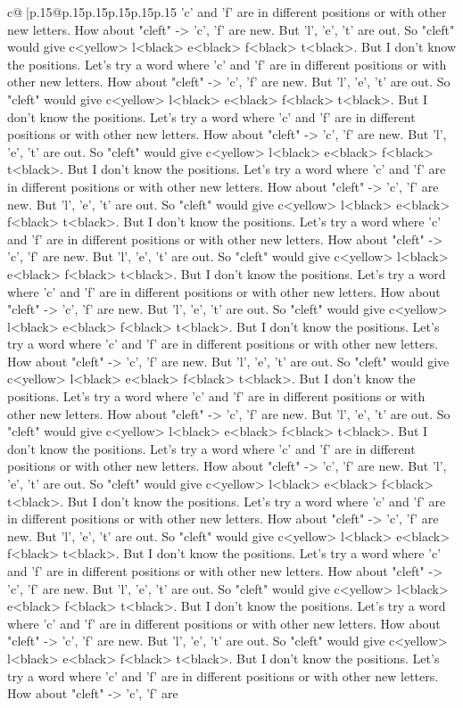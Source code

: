 \documentclass{article}
\begin{document}
{\begin{supertabular}{c@{$\;$}|p{.15\linewidth}@{}p{.15\linewidth}p{.15\linewidth}p{.15\linewidth}p{.15\linewidth}p{.15\linewidth}}
{{{'c' and 'f' are in different positions or with other new letters. How about "cleft" {-}> 'c', 'f' are new. But 'l', 'e', 't' are out. So "cleft" would give c<yellow> l<black> e<black> f<black> t<black>. But I don't know the positions. Let's try a word where 'c' and 'f' are in different positions or with other new letters. How about "cleft" {-}> 'c', 'f' are new. But 'l', 'e', 't' are out. So "cleft" would give c<yellow> l<black> e<black> f<black> t<black>. But I don't know the positions. Let's try a word where 'c' and 'f' are in different positions or with other new letters. How about "cleft" {-}> 'c', 'f' are new. But 'l', 'e', 't' are out. So "cleft" would give c<yellow> l<black> e<black> f<black> t<black>. But I don't know the positions. Let's try a word where 'c' and 'f' are in different positions or with other new letters. How about "cleft" {-}> 'c', 'f' are new. But 'l', 'e', 't' are out. So "cleft" would give c<yellow> l<black> e<black> f<black> t<black>. But I don't know the positions. Let's try a word where 'c' and 'f' are in different positions or with other new letters. How about "cleft" {-}> 'c', 'f' are new. But 'l', 'e', 't' are out. So "cleft" would give c<yellow> l<black> e<black> f<black> t<black>. But I don't know the positions. Let's try a word where 'c' and 'f' are in different positions or with other new letters. How about "cleft" {-}> 'c', 'f' are new. But 'l', 'e', 't' are out. So "cleft" would give c<yellow> l<black> e<black> f<black> t<black>. But I don't know the positions. Let's try a word where 'c' and 'f' are in different positions or with other new letters. How about "cleft" {-}> 'c', 'f' are new. But 'l', 'e', 't' are out. So "cleft" would give c<yellow> l<black> e<black> f<black> t<black>. But I don't know the positions. Let's try a word where 'c' and 'f' are in different positions or with other new letters. How about "cleft" {-}> 'c', 'f' are new. But 'l', 'e', 't' are out. So "cleft" would give c<yellow> l<black> e<black> f<black> t<black>. But I don't know the positions. Let's try a word where 'c' and 'f' are in different positions or with other new letters. How about "cleft" {-}> 'c', 'f' are new. But 'l', 'e', 't' are out. So "cleft" would give c<yellow> l<black> e<black> f<black> t<black>. But I don't know the positions. Let's try a word where 'c' and 'f' are in different positions or with other new letters. How about "cleft" {-}> 'c', 'f' are new. But 'l', 'e', 't' are out. So "cleft" would give c<yellow> l<black> e<black> f<black> t<black>. But I don't know the positions. Let's try a word where 'c' and 'f' are in different positions or with other new letters. How about "cleft" {-}> 'c', 'f' are new. But 'l', 'e', 't' are out. So "cleft" would give c<yellow> l<black> e<black> f<black> t<black>. But I don't know the positions. Let's try a word where 'c' and 'f' are in different positions or with other new letters. How about "cleft" {-}> 'c', 'f' are new. But 'l', 'e', 't' are out. So "cleft" would give c<yellow> l<black> e<black> f<black> t<black>. But I don't know the positions. Let's try a word where 'c' and 'f' are in different positions or with other new letters. How about "cleft" {-}> 'c', 'f' are }}}
\end{supertabular}}
\end{document}
